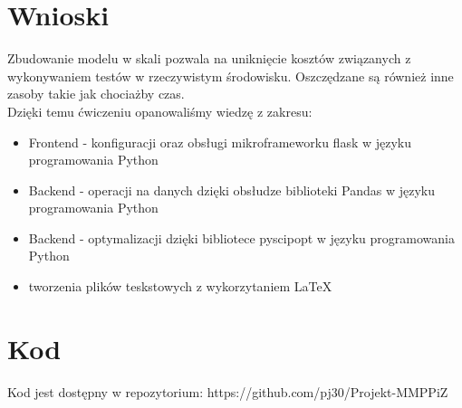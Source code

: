 \documentclass[11pt]{article}
\begin{document}
\section{Wnioski}
Zbudowanie modelu w skali pozwala na uniknięcie kosztów związanych z wykonywaniem testów w rzeczywistym środowisku. Oszczędzane są również inne zasoby takie jak chociażby czas.
\\Dzięki temu ćwiczeniu opanowaliśmy wiedzę z zakresu:
\begin{itemize}
	\item Frontend - konfiguracji oraz obsługi mikroframeworku flask w języku programowania Python
	\item Backend - operacji na danych dzięki obsłudze biblioteki Pandas w języku programowania Python
	\item Backend - optymalizacji dzięki bibliotece pyscipopt w języku programowania Python
	\item tworzenia plików teskstowych z wykorzytaniem LaTeX 
\end{itemize}

\newpage 

\section{Kod}
Kod jest dostępny w repozytorium: 
https://github.com/pj30/Projekt-MMPPiZ
\end{document}
